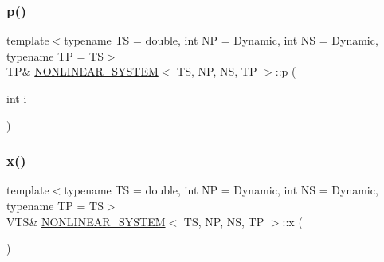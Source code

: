 \mbox{\label{class_n_o_n_l_i_n_e_a_r___s_y_s_t_e_m_a75739c8370b0aa04f8f03e88ac19d09b}} 
\subsubsection{\texorpdfstring{p()}{p()}\hspace{0.1cm}{\footnotesize\ttfamily [2/2]}}
{\footnotesize\ttfamily template$<$typename TS = double, int NP = Dynamic, int NS = Dynamic, typename TP = TS$>$ \\
TP\& \mbox{\hyperlink{class_n_o_n_l_i_n_e_a_r___s_y_s_t_e_m}{N\+O\+N\+L\+I\+N\+E\+A\+R\+\_\+\+S\+Y\+S\+T\+EM}}$<$ TS, NP, NS, TP $>$\+::p (\begin{DoxyParamCaption}\item[{int}]{i }\end{DoxyParamCaption})\hspace{0.3cm}{\ttfamily [inline]}}

\mbox{\label{class_n_o_n_l_i_n_e_a_r___s_y_s_t_e_m_a74d8eaa53624eae38a6f2e6b5bdd4381}} 
\subsubsection{\texorpdfstring{x()}{x()}\hspace{0.1cm}{\footnotesize\ttfamily [1/2]}}
{\footnotesize\ttfamily template$<$typename TS = double, int NP = Dynamic, int NS = Dynamic, typename TP = TS$>$ \\
V\+TS\& \mbox{\hyperlink{class_n_o_n_l_i_n_e_a_r___s_y_s_t_e_m}{N\+O\+N\+L\+I\+N\+E\+A\+R\+\_\+\+S\+Y\+S\+T\+EM}}$<$ TS, NP, NS, TP $>$\+::x (\begin{DoxyParamCaption}{ }\end{DoxyParamCaption})\hspace{0.3cm}{\ttfamily [inline]}}

